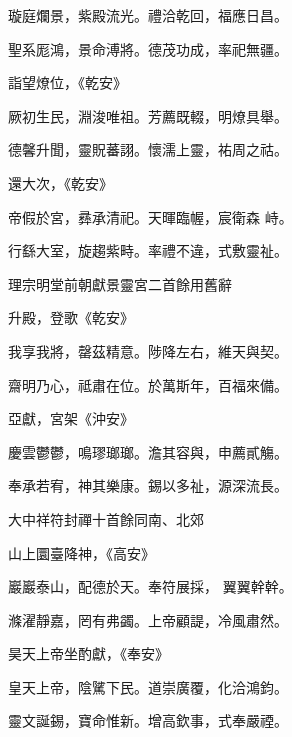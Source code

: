 \begin{pinyinscope}
 璇庭爛景，紫殿流光。禮洽乾回，福應日昌。



 聖系厖鴻，景命溥將。德茂功成，率祀無疆。



 詣望燎位，《乾安》



 厥初生民，淵浚唯祖。芳薦既輟，明燎具舉。



 德馨升聞，靈貺蕃詡。懷濡上靈，祐周之祜。



 還大次，《乾安》



 帝假於宮，彞承清祀。天暉臨幄，宸衛森
 峙。



 行繇大室，旋趨紫畤。率禮不違，式敷靈祉。



 理宗明堂前朝獻景靈宮二首餘用舊辭



 升殿，登歌《乾安》



 我享我將，罄茲精意。陟降左右，維天與契。



 齋明乃心，祗肅在位。於萬斯年，百福來備。



 亞獻，宮架《沖安》



 慶雲鬱鬱，鳴璆瑯瑯。澹其容與，申薦貳觴。



 奉承若宥，神其樂康。錫以多祉，源深流長。



 大中祥符封禪十首餘同南、北郊



 山上圜臺降神，《高安》



 巖巖泰山，配德於天。奉符展採，
 翼翼幹幹。



 滌濯靜嘉，罔有弗蠲。上帝顧諟，冷風肅然。



 昊天上帝坐酌獻，《奉安》



 皇天上帝，陰騭下民。道崇廣覆，化洽鴻鈞。



 靈文誕錫，寶命惟新。增高欽事，式奉嚴禋。




\end{pinyinscope}
